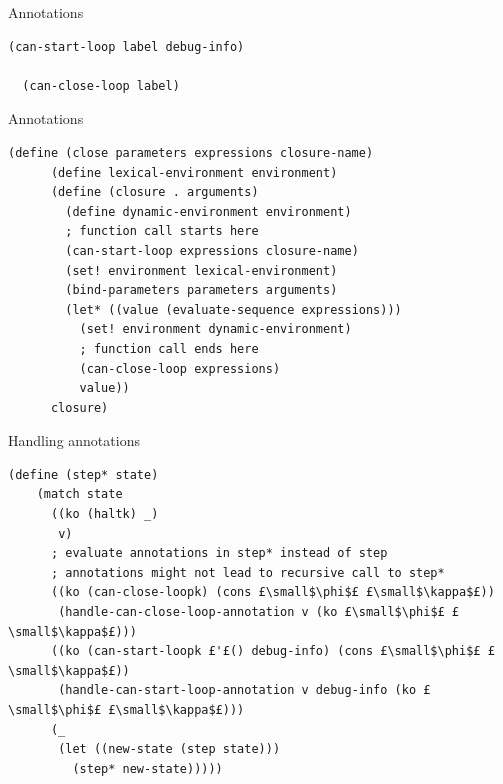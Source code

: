 \documentclass{beamer}
\begin{document}
\begin{frame}[fragile]{Annotations}

\begin{lstlisting}[basicstyle = \small\ttfamily, escapechar = £]
  (can-start-loop label debug-info)
  
  (can-close-loop label)
\end{lstlisting}

\end{frame}

\begin{frame}[fragile]{Annotations}

\begin{lstlisting}[basicstyle = \footnotesize\ttfamily, escapechar = £]
  (define (close parameters expressions closure-name)
      (define lexical-environment environment)
      (define (closure . arguments)
        (define dynamic-environment environment)
        ; function call starts here
        (can-start-loop expressions closure-name)
        (set! environment lexical-environment)
        (bind-parameters parameters arguments)
        (let* ((value (evaluate-sequence expressions)))
          (set! environment dynamic-environment)
          ; function call ends here
          (can-close-loop expressions)
          value))
      closure)
\end{lstlisting}

\end{frame}

\begin{frame}[fragile]{Handling annotations}

\begin{lstlisting}[basicstyle = \scriptsize\ttfamily, escapechar = £]
(define (step* state)
    (match state
      ((ko (haltk) _)
       v)
      ; evaluate annotations in step* instead of step
      ; annotations might not lead to recursive call to step*
      ((ko (can-close-loopk) (cons £\small$\phi$£ £\small$\kappa$£))
       (handle-can-close-loop-annotation v (ko £\small$\phi$£ £\small$\kappa$£)))
      ((ko (can-start-loopk £'£() debug-info) (cons £\small$\phi$£ £\small$\kappa$£))
       (handle-can-start-loop-annotation v debug-info (ko £\small$\phi$£ £\small$\kappa$£)))
      (_
       (let ((new-state (step state)))
         (step* new-state)))))
\end{lstlisting}

\end{frame}
\end{document}
